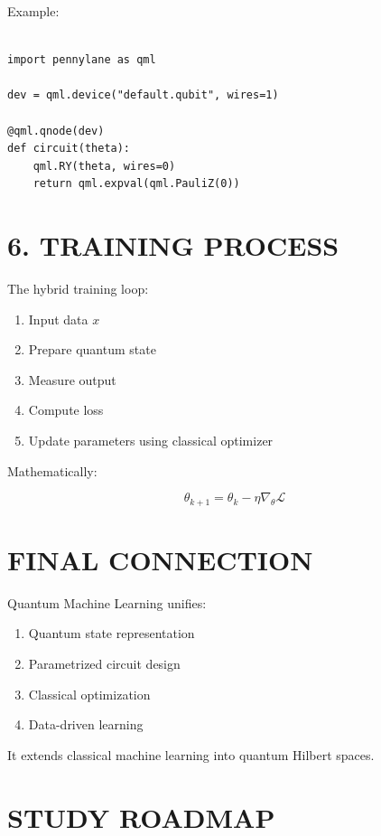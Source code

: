 Example:

\begin{verbatim}

import pennylane as qml

dev = qml.device("default.qubit", wires=1)

@qml.qnode(dev)
def circuit(theta):
    qml.RY(theta, wires=0)
    return qml.expval(qml.PauliZ(0))
\end{verbatim}

\vspace{0.5cm}

\section*{6. TRAINING PROCESS}

The hybrid training loop:

\begin{enumerate}
\item Input data $x$
\item Prepare quantum state
\item Measure output
\item Compute loss
\item Update parameters using classical optimizer
\end{enumerate}

Mathematically:

\[
\theta_{k+1} = \theta_k - \eta \nabla_\theta \mathcal{L}
\]

\vspace{0.5cm}

\section*{FINAL CONNECTION}

Quantum Machine Learning unifies:

\begin{enumerate}
\item Quantum state representation
\item Parametrized circuit design
\item Classical optimization
\item Data-driven learning
\end{enumerate}

It extends classical machine learning into quantum Hilbert spaces.

\vspace{0.5cm}

\section*{STUDY ROADMAP}


